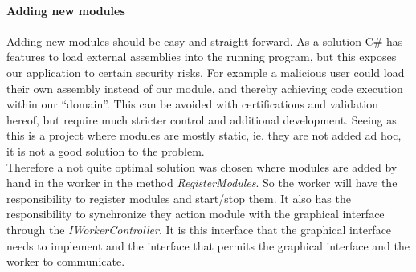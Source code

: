\documentclass{article}
\begin{document}


\paragraph{Adding new modules} Adding new modules should be easy and straight forward. As a solution C\# has features to load external assemblies into the running program\cite{url:considerations:load-assembly-runtime}, but this exposes our application to certain security risks. For example a malicious user could load their own assembly instead of our module, and thereby achieving code execution within our \enquote{domain}. This can be avoided with certifications and validation hereof, but require much stricter control and additional development. Seeing as this is a project where modules are mostly static, ie. they are not added ad hoc, it is not a good solution to the problem.
\\
Therefore a not quite optimal solution was chosen where modules are added by hand in the worker in the method \emph{RegisterModules}. So the worker will have the responsibility to register modules and start/stop them. It also has the responsibility to synchronize they action module with the graphical interface through the \emph{IWorkerController}. It is this interface that the graphical interface needs to implement and the interface that permits the graphical interface and the worker to communicate.
\end{document}
